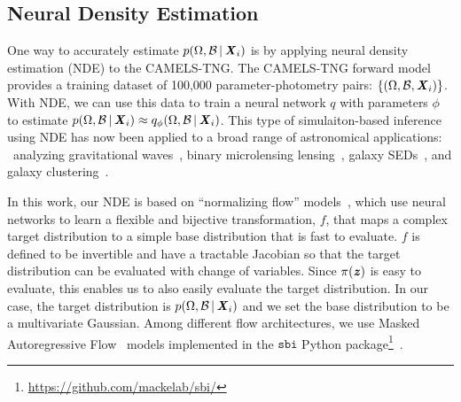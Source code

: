 \subsection{Neural Density Estimation} \label{sec:anpe}
One way to accurately estimate $p(\Omega, \mathcal{B}\,|\, {\textbf{\textit{X}}_i})$ is
by applying neural density estimation (NDE) to the CAMELS-TNG.
The CAMELS-TNG forward model provides a training dataset of 100,000
parameter-photometry pairs: $\{(\Omega, \mathcal{B}, {\textbf{\textit{X}}_i})\}$.
With NDE, we can use this data to train a neural network $q$ with parameters
$\phi$ to estimate 
$p(\Omega, \mathcal{B}\,|\, {\textbf{\textit{X}}_i}) \approx
q_\phi(\Omega, \mathcal{B}\,|\, {\textbf{\textit{X}}_i})$.
This type of simulaiton-based inference using NDE has now been applied to a
broad range of astronomical applications:
\eg~analyzing gravitational waves~\citep{wong2020, dax2021}, binary
microlensing lensing~\citep{zhang2021}, galaxy SEDs~\cite{hahn2022a}, and
galaxy clustering~\cite{hahn2022d, hahn2023}. 

In this work, our NDE is based on ``normalizing flow'' models~\citep{tabak2010,
tabak2013}, which use neural networks to learn a flexible and bijective
transformation, $f$, that maps a complex target distribution to a simple base
distribution that is fast to evaluate.
$f$ is defined to be invertible and have a tractable Jacobian so that the 
target distribution can be evaluated with change of variables. 
Since $\pi(\textbf{\textit{z}})$ is easy to evaluate, this enables us to also easily 
evaluate the target distribution.
In our case, the target distribution is 
$p(\Omega, \mathcal{B}\,|\, {\textbf{\textit{X}}_i})$ and we set the base distribution to
be a multivariate Gaussian. 
Among different flow architectures, we use Masked Autoregressive
Flow~\citep[MAF;][]{papamakarios2017} models implemented in the $\mathtt{sbi}$
Python
package\footnote{\url{https://github.com/mackelab/sbi/}}~\citep{greenberg2019,
tejero-cantero2020}.

